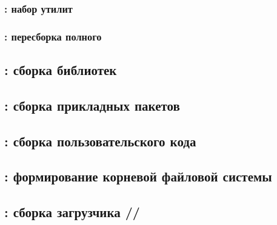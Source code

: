 \subsubsection{: набор утилит } \label{azbb}

\subsubsection{: пересборка полного } \label{azgcc}

\subsection{: сборка библиотек } \label{azlibs}

\subsection{: сборка прикладных пакетов }
\label{azapps}

\subsection{: сборка пользовательского кода} \label{azuser}

\subsection{: формирование корневой файловой системы} \label{azroot}
\subsection{: сборка загрузчика
//
} \label{azboot}

\subsubsection{}

\subsubsection{}

\subsubsection{}

